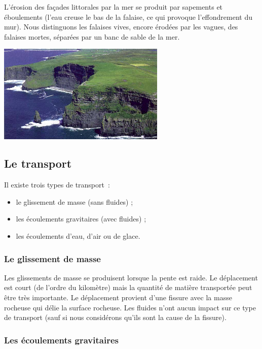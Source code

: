 \documentclass[a4paper,11pt]{article}
\begin{document}
L'érosion des façades littorales par la mer se produit par sapements et éboulements (l'eau creuse le bas de la falaise, ce qui provoque l'effondrement du mur).
Nous distinguons les falaises vives, encore érodées par les vagues, des falaises mortes, séparées par un banc de sable de la mer.

\begin{center}
  \includegraphics[width=8cm]{Images/Erosion/cliffs.jpg}
\end{center}

\subsection{Le transport}
Il existe trois types de transport~:
\begin{itemize}
 \item le glissement de masse (sans fluides) ;
 \item les écoulements gravitaires (avec fluides) ;
 \item les écoulements d'eau, d'air ou de glace.
\end{itemize}

\subsubsection{Le glissement de masse}

Les glissements de masse se produisent lorsque la pente est raide.
Le déplacement est court (de l'ordre du kilomètre) mais la quantité de matière transportée peut être très importante.
Le déplacement provient d'une fissure avec la masse rocheuse qui délie la surface rocheuse.
Les fluides n'ont aucun impact sur ce type de transport (sauf si nous considérons qu'ils sont la cause de la fissure).

\subsubsection{Les écoulements gravitaires}
\end{document}
